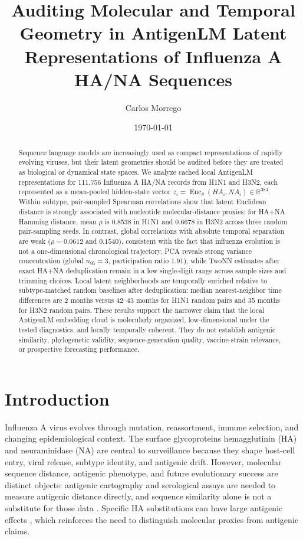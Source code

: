 \documentclass[11pt]{article}
\title{Auditing Molecular and Temporal Geometry in AntigenLM Latent Representations of Influenza A HA/NA Sequences}
\author{Carlos Morrego}
\date{\today}
\newcommand{\Enc}{\operatorname{Enc}}
\newcommand{\R}{\mathbb{R}}
\begin{document}
\maketitle

\begin{abstract}
Sequence language models are increasingly used as compact representations of rapidly evolving viruses, but their latent geometries should be audited before they are treated as biological or dynamical state spaces. We analyze cached local AntigenLM representations for 111,756 Influenza A HA/NA records from H1N1 and H3N2, each represented as a mean-pooled hidden-state vector $z_i=\Enc_{\theta}(HA_i,NA_i)\in\R^{384}$. Within subtype, pair-sampled Spearman correlations show that latent Euclidean distance is strongly associated with nucleotide molecular-distance proxies: for HA+NA Hamming distance, mean $\rho$ is 0.8538 in H1N1 and 0.6678 in H3N2 across three random pair-sampling seeds. In contrast, global correlations with absolute temporal separation are weak ($\rho=0.0612$ and $0.1540$), consistent with the fact that influenza evolution is not a one-dimensional chronological trajectory. PCA reveals strong variance concentration (global $n_{95}=3$, participation ratio 1.91), while TwoNN estimates after exact HA+NA deduplication remain in a low single-digit range across sample sizes and trimming choices. Local latent neighborhoods are temporally enriched relative to subtype-matched random baselines after deduplication: median nearest-neighbor time differences are 2 months versus 42--43 months for H1N1 random pairs and 35 months for H3N2 random pairs. These results support the narrower claim that the local AntigenLM embedding cloud is molecularly organized, low-dimensional under the tested diagnostics, and locally temporally coherent. They do not establish antigenic similarity, phylogenetic validity, sequence-generation quality, vaccine-strain relevance, or prospective forecasting performance.
\end{abstract}

\section{Introduction}

Influenza A virus evolves through mutation, reassortment, immune selection, and changing epidemiological context. The surface glycoproteins hemagglutinin (HA) and neuraminidase (NA) are central to surveillance because they shape host-cell entry, viral release, subtype identity, and antigenic drift. However, molecular sequence distance, antigenic phenotype, and future evolutionary success are distinct objects: antigenic cartography and serological assays are needed to measure antigenic distance directly, and sequence similarity alone is not a substitute for those data \cite{smith2004mapping,bedford2014integrating}. Specific HA substitutions can have large antigenic effects \cite{koel2013substitutions}, which reinforces the need to distinguish molecular proxies from antigenic claims.
\end{document}
